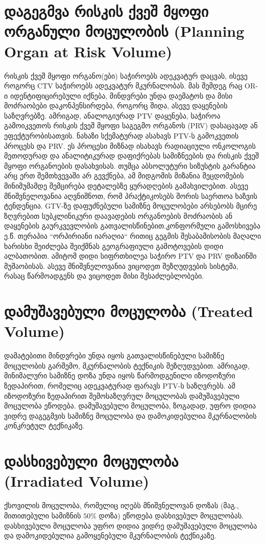 \documentclass[12pt,a4paper,]{report}
\begin{document}
\section{დაგეგმვა რისკის ქვეშ მყოფი ორგანული მოცულობის (Planning Organ at Risk Volume)}
რისკის ქვეშ მყოფი ორგანო(ები) საჭიროებს ადეკვატურ დაცვას, ისევე როგორც CTV საჭიროებს  ადეკვატურ მკურნალობას. მას შემდეგ რაც OR-ი იდენტიფიცირებული იქნება, მინდვრები უნდა დაემატოს და მისი მოძრაობები დაკონპენსირდება, როგორც შიდა, ასევე დაყენების საზღვრებზე. ამრიგად, ანალოგიურად PTV დაყენება, საჭიროა გამოიკვეთოს რისკის ქვეშ მყოფი საგეგმო ორგანოს (PRV) დასაცავად ან ეფექტურობისათვის. ნახაზი სქემატურად ასახავს PTV-ს გამოკვეთის პროცესს და PRV. ეს პროცესი მიზნად ისახავს რადიაციული ონკოლოგის მეთოდურად და ანალიტიკურად დაფიქრებას სამიზნეების და რისკის ქვეშ მყოფი ორგანოების დასახვისას. თუმცა აბსოლუტური სიზუსტის გარანტია არც ერთ შემთხვევაში არ გევქნება, ამ მიდგომის მიზანია შეცდომების მინიმუმამდე შემცირება დეტალებზე ყურადღების გამახვილებით. ასევე მნიშვნელოვანია აღვნიშნოთ, რომ პრაქტიკოსებს შორის საერთოა ხაზვის ტენდენცია.
GTV-ზე დაფუძნებული სამიზნე მოცულობები არსებობს მცირე ზღვრებით სუბკლინიკური დაავადების ორგანოების მოძრაობის ან დაყენების გაურკვევლობის გათვალისწინებით.კონფორმული გამოსხივება ე.წ. თერაპია “ორპირიანი იარაღია“ რითიც გეგმის შესაბამისობის მაღალი ხარისხი შეიძლება შეიქმნას გეოგრაფიული გამოტოვების დიდი ალბათობით.  ამიტომ დიდი სიფრთხილეა საჭირო PTV და PRV დიზაინში მუშაობისას. ასევე მნიშვნელოვანია ვიცოდეთ შეზღუდვების სისტემა, რასაც წარმოადგენს და ვიცოდეთ მისი შესაძლებლობები.

\section{დამუშავებული მოცულობა (Treated Volume)}
დამატებითი მინდვრები უნდა იყოს გათვალისწინებული სამიზნე მოცულობის გარშემო, მკურნალობის ტექნიკის შეზღუდვებით. ამრიგად, მინიმალური სამიზნე დოზა უნდა იყოს წარმოდგენილი იზოდოზური ზედაპირით, რომელიც ადეკვატურად ფარავს PTV-ს საზღვრებს. ამ იზოდოზური ზედაპირით შემოსაზღვრულ მოცულობას დამუშავებული მოცულობა ეწოდება. დამუშავებული მოცულობა, ზოგადად, უფრო დიდია ვიდრე დაგეგმვის სამიზნე მოცულობა და დამოკიდებულია მკურნალობის კონკრეტულ ტექნიკაზე.

\section{დასხივებული მოცულობა (Irradiated Volume)}
ქსოვილის მოცულობა, რომელიც იღებს მნიშვნელოვან დოზას (მაგ., მითითებული სამიზნის $50\%$ დოზა) ეწოდება დასხივებულ მოცულობას. დასხივებული მოცულობა უფრო დიდია ვიდრე დამუშავებული მოცულობა და დამოკიდებულია გამოყენებული მკურნალობის ტექნიკაზე.
\end{document}
